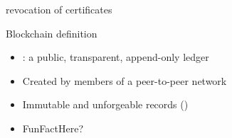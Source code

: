 %  
%  
%  





\begin{frame}

revocation of certificates

\end{frame}


\begin{frame}{Blockchain definition}

\begin{itemize}
\item {}: a public, transparent,
append-only ledger
\item Created by members of a peer-to-peer
network
\item Immutable and unforgeable records ()
\item FunFactHere?
\end{itemize}

\end{frame}



